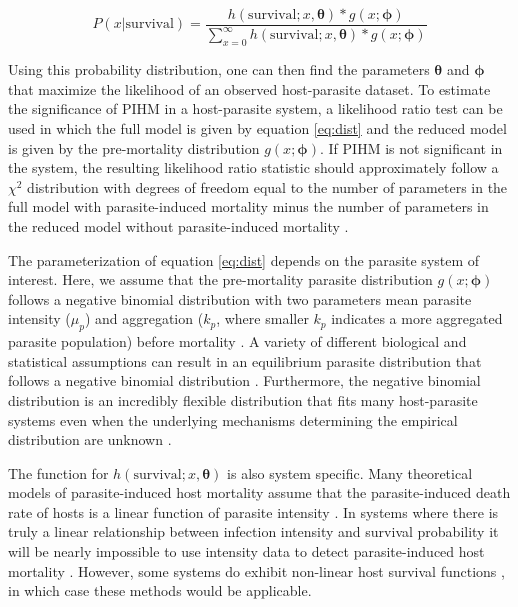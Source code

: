 \documentclass[12pt, a4paper]{article}
\begin{document}
\begin{equation}
    P(x | \text{survival}) = \dfrac{h(\text{survival}; x, \boldsymbol{\theta})  * g(x; \boldsymbol{\phi})}{\sum_{x=0}^{\infty} h(\text{survival}; x, \boldsymbol{\theta})  * g(x; \boldsymbol{\phi})}
    \label{eq:dist}
\end{equation}


Using this probability distribution, one can then find the parameters $\boldsymbol{\theta}$
and $\boldsymbol{\phi}$ that maximize the likelihood of an observed host-parasite dataset.
To estimate the significance of PIHM in a host-parasite system, a likelihood
ratio test can be used in which the full model is given by equation
\ref{eq:dist} and the reduced model is given by the pre-mortality distribution
$g(x; \boldsymbol{\phi})$.  If PIHM is not significant in the system, the resulting
likelihood ratio statistic should approximately follow a $\chi^2$ distribution
with degrees of freedom equal to the number of parameters in the full model with parasite-induced mortality minus the number of parameters in the reduced model without parasite-induced mortality \citep{Bolker2008}.

The parameterization of equation \ref{eq:dist} depends on the parasite system of interest.  Here, we assume that the pre-mortality parasite distribution $g(x; \boldsymbol{\phi})$ follows a negative binomial
distribution with two parameters mean parasite intensity ($\mu_p$) and
aggregation ($k_p$, where smaller $k_p$ indicates a more aggregated parasite population) before mortality \citep{Crofton1971a,AndersonandMay1978,Adjei1986}. A variety of different biological and statistical assumptions can result in an equilibrium parasite distribution that follows a negative binomial distribution
\citep{Kendall1948a, Boswell1970, Calabrese2011}. Furthermore, the negative binomial distribution is an incredibly flexible distribution that fits many host-parasite systems even when the underlying mechanisms determining the empirical distribution are unknown \citep{Shaw1998}.

The function for $h(\text{survival}; x,
\boldsymbol{\theta})$ is also system specific.  Many
theoretical models of parasite-induced host mortality assume that the parasite-induced death rate of hosts is a linear function of parasite intensity
\citep{AndersonandMay1978,Dobson1992,Barbour2000}. In systems where there is truly a linear relationship between infection intensity and survival probability it will be nearly impossible to use intensity data to detect parasite-induced host mortality \citep{Lanciani1989}.  However, some systems do exhibit non-linear host survival functions \citep{Benesh2011}, in which case these methods would be applicable.
\end{document}
